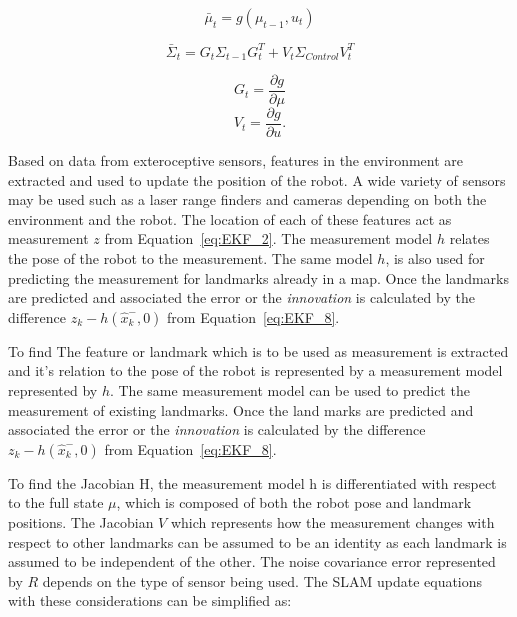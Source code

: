 \begin{equation}
\bar{\mu}_{t} =g(\mu_{t-1},u_{t})
\end{equation}

\begin{equation}
\bar{\Sigma}_{t}=G_{t}\Sigma_{t-1}G_{t}^{T}+V_{t}\Sigma_{Control}V_{t}^{T}
\end{equation}

\begin{equation}
G_{t}=\frac{\partial g}{\partial \mu} 
\end{equation}
\begin{equation}
V_{t}=\frac{\partial g}{\partial u}.
\end{equation}
%

 Based on data from exteroceptive sensors, features in the environment are extracted and used to update the position of the robot. A wide variety of sensors may be used such as a laser range finders and cameras depending on both the environment and the robot. The location of each of these features act as measurement $ z $ from Equation~\ref{eq:EKF_2}. The measurement model $ h $ relates the pose of the robot to the measurement. The same model $ h $, is also used for predicting the measurement for landmarks already in a map.  Once the landmarks are predicted and associated the error or the \textit{innovation} is calculated by the difference $ z_k-h(\hat{x}^-_k,0) $ from Equation~\ref{eq:EKF_8}. 
  
 To find 
 The feature or landmark which is to be used as measurement is extracted and it's relation to the pose of the robot is represented by a measurement model represented by $ h $. The same measurement model can be used to predict the measurement of existing landmarks. Once the land marks are predicted and associated the error or the \textit{innovation} is calculated by the difference $ z_k-h(\hat{x}^-_k,0) $ from Equation~\ref{eq:EKF_8}. 
 
 To find the Jacobian H, the measurement model h is differentiated with respect to the full state $ \mu $, which is composed of both the robot pose and landmark positions. The Jacobian $ V $ which represents how the measurement changes with respect to other landmarks can be assumed to be an identity as each landmark is assumed to be independent of the other. The noise covariance error represented by $ R $ depends on the type of sensor being used. The SLAM update equations with these considerations can be simplified as:
 
